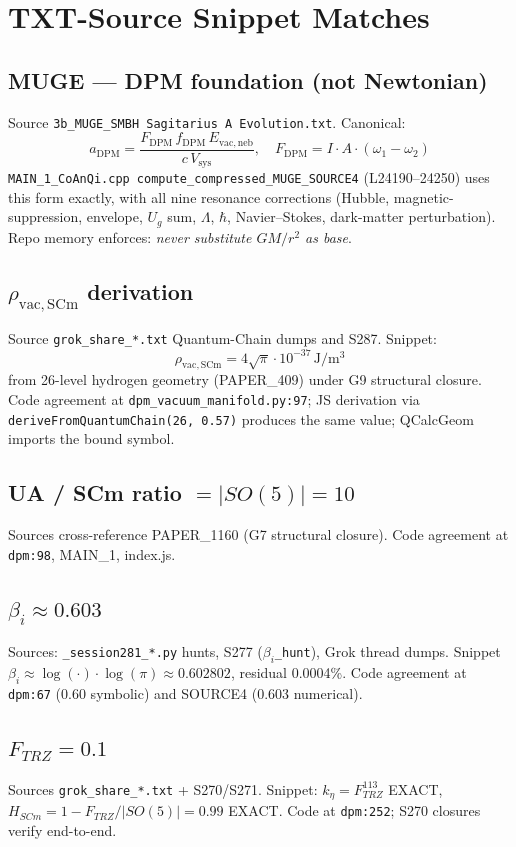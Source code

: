 \documentclass[11pt]{article}
\begin{document}
\section{TXT-Source Snippet Matches}

\subsection{MUGE --- DPM foundation (not Newtonian)}
Source \texttt{3b\_MUGE\_SMBH Sagitarius A Evolution.txt}. Canonical:
\[
  a_{\mathrm{DPM}} = \frac{F_{\mathrm{DPM}}\, f_{\mathrm{DPM}}\, E_{\mathrm{vac,neb}}}{c\, V_{\mathrm{sys}}}, \quad F_{\mathrm{DPM}} = I\cdot A\cdot(\omega_1 - \omega_2)
\]
\texttt{MAIN\_1\_CoAnQi.cpp compute\_compressed\_MUGE\_SOURCE4} (L24190--24250) uses this form exactly, with all nine resonance corrections (Hubble, magnetic-suppression, envelope, $U_g$ sum, $\Lambda$, $\hbar$, Navier--Stokes, dark-matter perturbation). Repo memory enforces: \emph{never substitute $GM/r^2$ as base}.

\subsection{$\rho_{\mathrm{vac,SCm}}$ derivation}
Source \texttt{grok\_share\_*.txt} Quantum-Chain dumps and S287. Snippet:
\[
  \rho_{\mathrm{vac,SCm}} = 4\sqrt{\pi}\cdot 10^{-37}\,\mathrm{J/m^3}
\]
from 26-level hydrogen geometry (PAPER\_409) under G9 structural closure. Code agreement at \texttt{dpm\_vacuum\_manifold.py:97}; JS derivation via \texttt{deriveFromQuantumChain(26, 0.57)} produces the same value; QCalcGeom imports the bound symbol.

\subsection{UA / SCm ratio $= |SO(5)| = 10$}
Sources cross-reference PAPER\_1160 (G7 structural closure). Code agreement at \texttt{dpm:98}, MAIN\_1, index.js.

\subsection{$\beta_i \approx 0.603$}
Sources: \texttt{\_session281\_*.py} hunts, S277 (\texttt{$\beta_i$\_hunt}), Grok thread dumps. Snippet $\beta_i \approx \log(\cdot)\cdot\log(\pi) \approx 0.602802$, residual 0.0004\%. Code agreement at \texttt{dpm:67} (0.60 symbolic) and SOURCE4 (0.603 numerical).

\subsection{$F_{TRZ} = 0.1$}
Sources \texttt{grok\_share\_*.txt} + S270/S271. Snippet: $k_\eta = F_{TRZ}^{113}$ EXACT, $H_{SCm} = 1 - F_{TRZ}/|SO(5)| = 0.99$ EXACT. Code at \texttt{dpm:252}; S270 closures verify end-to-end.
\end{document}
